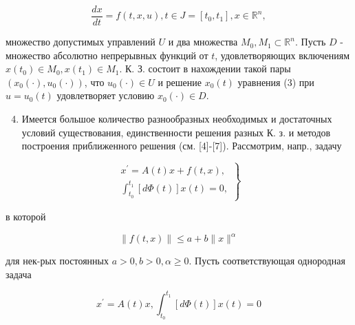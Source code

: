 \documentclass[10pt]{article}
\begin{document}
\[

\frac{d x}{d t}=f(t, x, u), t \in J=\left[t_{0}, t_{1}\right], x \in \mathbb{R}^{n},

\]



множество допустимых управлений $U$ и два множества $M_{0}, M_{1} \subset \mathbb{R}^{n}$. Пусть $D$ - множество абсолютно непрерывных функций от $t$, удовлетворяющих включениям $x\left(t_{0}\right) \in M_{0}, x\left(t_{1}\right) \in M_{1}$. К. З. состоит в нахождении такой пары $\left(x_{0}(\cdot), u_{0}(\cdot)\right)$, что $u_{0}(\cdot) \in U$ и решение $x_{0}(t)$ уравнения (3) при $u=u_{0}(t)$ удовлетворяет условию $x_{0}(\cdot) \in D$.



\begin{enumerate}

  \setcounter{enumi}{3}

  \item Имеется большое количество разнообразных необходимых и достаточных условий существования, единственности решения разных К. з. и методов построения приближенного решения (см. [4]-[7]). Рассмотрим, напр., задачу

\end{enumerate}



\[

\left.\begin{array}{l}

x^{\prime}=A(t) x+f(t, x), \\

\int_{t_{0}}^{t_{1}}[d \Phi(t)] x(t)=0,

\end{array}\right\}

\]



в которой



\[

\|f(t, x)\| \leqslant a+b\|x\|^{\alpha}

\]



для нек-рых постоянных $a>0, b>0, \alpha \geqslant 0$. Пусть соответствующая однородная задача



\[

x^{\prime}=A(t) x, \int_{t_{0}}^{t_{1}}[d \Phi(t)] x(t)=0

\]
\end{document}
